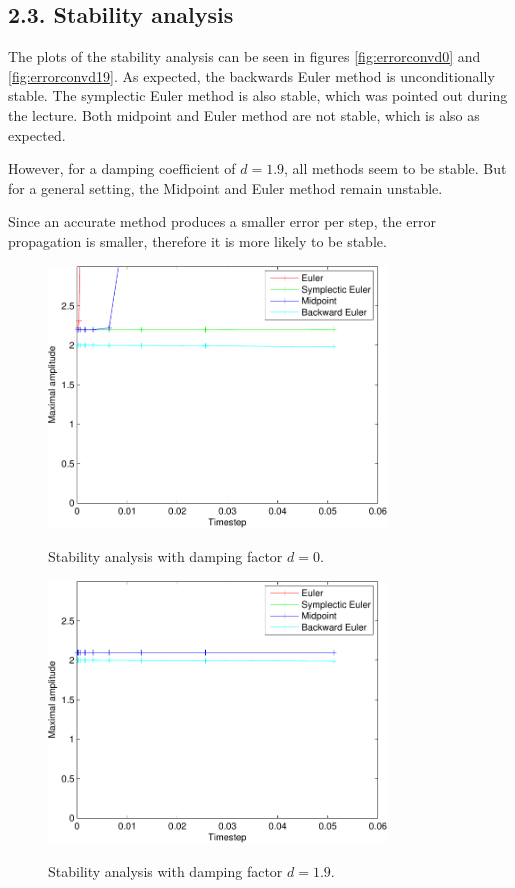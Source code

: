 \subsection*{2.3. Stability analysis}
The plots of the stability analysis can be seen in figures \ref{fig:errorconvd0} and \ref{fig:errorconvd19}. As expected, the backwards Euler method is unconditionally stable. The symplectic Euler method is also stable, which was pointed out during the lecture. Both midpoint and Euler method are not stable, which is also as expected.

However, for a damping coefficient of $d=1.9$, all methods seem to be stable. But for a general setting, the Midpoint and Euler method remain unstable.

Since an accurate method produces a smaller error per step, the error propagation is smaller, therefore it is more likely to be stable.

\begin{figure}
	\centering
		\includegraphics*[width=0.8\textwidth]{../data/ex1/stabilityMeasurementDamp0-crop.pdf}
	\label{fig:stabanald0} 
	\caption{Stability analysis with damping factor $d=0$.}
\end{figure}
\begin{figure}
	\centering
		\includegraphics*[width=0.8\textwidth]{../data/ex1/stabilityMeasurementDamp1_9-crop.pdf}
	\label{fig:stabanald19} 
	\caption{Stability analysis with damping factor $d=1.9$.}
\end{figure}


